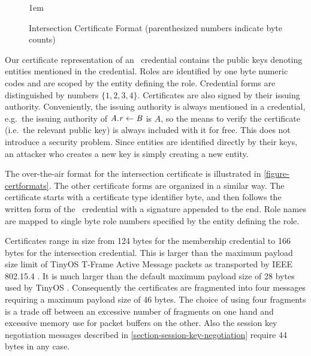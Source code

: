 \begin{figure}[t]
  
  \centerline{\raise 1em\box\graph}
  \vspace{2mm}
  \caption{Intersection Certificate Format (parenthesized numbers indicate byte counts)}
  \label{figure-certformats}
\end{figure}

Our certificate representation of an \RT\ credential contains the public
keys denoting entities mentioned in the credential. Roles are identified
by one byte numeric codes and are scoped by the entity defining the
role. Credential forms are distinguished by numbers $\{ 1, 2, 3, 4 \}$.
Certificates are also signed by their issuing authority. Conveniently,
the issuing authority is always mentioned in a credential, e.g.~the
issuing authority of $\mathit{A.r} \leftarrow \mathit{B}$ is $A$, so the means to verify the
certificate (i.e.~the relevant public key) is always included with it
for free. This does not introduce a security problem. Since entities are
identified directly by their keys, an attacker who creates a new key is
simply creating a new entity.

The over-the-air format for the intersection certificate is illustrated
in \autoref{figure-certformats}. The other certificate forms are
organized in a similar way. The certificate starts with a certificate
type identifier byte, and then follows the written form of the \RT\
credential with a signature appended to the end. Role names are mapped
to single byte role numbers specified by the entity defining the role.

Certificates range in size from 124 bytes for the membership credential
to 166 bytes for the intersection credential. This is larger than the
maximum payload size limit of TinyOS T-Frame Active Message packets as
transported by IEEE 802.15.4 \cite{802.15.4,hui-tep125}. It is much
larger than the default maximum payload size of 28 bytes used by TinyOS
\cite{levis-tep111}. Consequently the certificates are fragmented into
four messages requiring a maximum payload size of 46 bytes. The choice
of using four fragments is a trade off between an excessive number of
fragments on one hand and excessive memory use for packet buffers on the
other. Also the session key negotiation messages described in
\autoref{section-session-key-negotiation} require 44 bytes in any case.


